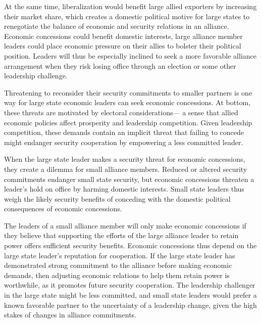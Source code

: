 \documentclass[12pt]{article}
\begin{document}
At the same time, liberalization would benefit large allied exporters by increasing their market share, which creates a domestic political motive for large states to renegotiate the balance of economic and security relations in an alliance. 
Economic concessions could benefit domestic interests, large alliance member leaders could place economic pressure on their allies to bolster their political position. 
Leaders will thus be especially inclined to seek a more favorable alliance arrangement when they risk losing office through an election or some other leadership challenge. 


Threatening to reconsider their security commitments to smaller partners is one way for large state economic leaders can seek economic concessions.
At bottom, these threats are motivated by electoral considerations--- a sense that allied economic policies affect prosperity and leadership competition. 
Given leadership competition, these demands contain an implicit threat that failing to concede might endanger security cooperation by empowering a less committed leader.


When the large state leader makes a security threat for economic concessions, they create a dilemma for small alliance members. 
Reduced or altered security commitments endanger small state security, but economic concessions threaten a leader's hold on office by harming domestic interests. 
Small state leaders thus weigh the likely security benefits of conceding with the domestic political consequences of economic concessions.


The leaders of a small alliance member will only make economic concessions if they believe that supporting the efforts of the large alliance leader to retain power offers sufficient security benefits. 
Economic concessions thus depend on the large state leader's reputation for cooperation. 
If the large state leader has demonstrated strong commitment to the alliance before making economic demands, then adjusting economic relations to help them retain power is worthwhile, as it promotes future security cooperation. 
The leadership challenger in the large state might be less committed, and small state leaders would prefer a known favorable partner to the uncertainty of a leadership change, given the high stakes of changes in alliance commitments.
\end{document}
